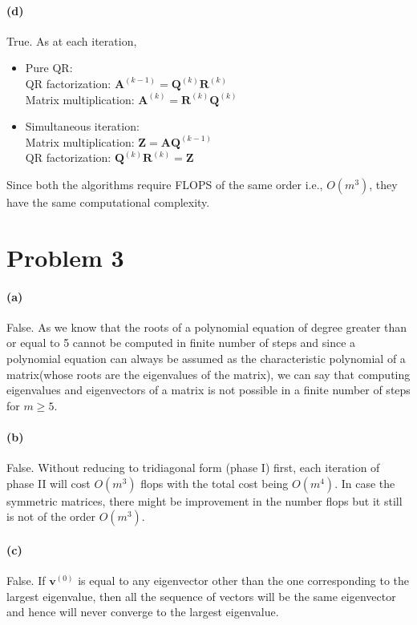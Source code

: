 \documentclass[12pt, letterpaper]{article}
\begin{document}
\paragraph{(d)} True. As at each iteration,
\begin{itemize}
\item Pure QR: \\
  QR factorization: $\mathbf{A}^{(k-1)} = \mathbf{Q}^{(k)}\mathbf{R}^{(k)}$\\
  Matrix multiplication: $\mathbf{A}^{(k)} = \mathbf{R}^{(k)}\mathbf{Q}^{(k)}$\\
\item Simultaneous iteration: \\
  Matrix multiplication: $\mathbf{Z} = \mathbf{A}\mathbf{Q}^{(k-1)}$\\
  QR factorization: $\mathbf{Q}^{(k)}\mathbf{R}^{(k)} = \mathbf{Z}$\\
\end{itemize}

Since both the algorithms require FLOPS of the same order i.e., $O(m^3)$, they have the same computational complexity.

\pagebreak
\section*{Problem 3}

\paragraph{(a)} False. As we know that the roots of a polynomial equation of degree greater than or equal to 5 cannot be computed in finite number of steps and since a polynomial equation can always be assumed as the characteristic polynomial of a matrix(whose roots are the eigenvalues of the matrix), we can say that computing eigenvalues and eigenvectors of a matrix is not possible in a finite number of steps for $m \geq 5$.

\paragraph{(b)} False. Without reducing to tridiagonal form (phase I) first, each iteration of phase II will cost $O(m^3)$ flops with the total cost being $O(m^4)$. In case the symmetric matrices, there might be improvement in the number flops but it still is not of the order $O(m^3)$.

\paragraph{(c)} False. If $\mathbf{v}^{(0)}$ is equal to any eigenvector other than the one corresponding to the largest eigenvalue, then all the sequence of vectors will be the same eigenvector and hence will never converge to the largest eigenvalue.
\end{document}
